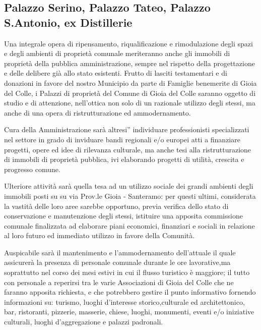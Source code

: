 \documentclass[a4paper,14pt,italian]{sphinxmanual}
\begin{document}
\subsection{Palazzo Serino, Palazzo Tateo, Palazzo S.Antonio, ex Distillerie}
\label{\detokenize{cultura:palazzo-serino-palazzo-tateo-palazzo-s-antonio-ex-distillerie}}

Una integrale opera di ripensamento, riqualificazione e rimodulazione degli spazi e degli ambienti di proprietà comunale meriteranno anche gli immobili di proprietà della pubblica amministrazione, sempre nel rispetto della progettazione e delle delibere già allo stato esistenti.
Frutto di lasciti testamentari e di donazioni in favore del nostro Municipio da parte di Famiglie benemerite di Gioia del Colle, i Palazzi di proprietà del Comune di Gioia del Colle saranno oggetto di studio e di attenzione, nell’ottica non solo di un razionale utilizzo degli stessi, ma anche di una opera di ristrutturazione ed ammodernamento.

Cura della Amministrazione sarà altresi” individuare professionisti specializzati nel settore in grado di inviduare bandi regionali e/o europei atti a finanziare progetti, opere ed idee di rilevanza culturale, ma anche tesi alla ristrutturazione di immobili di proprietà pubblica, ivi elaborando progetti di utilità, crescita e progresso comune.

Ulteriore attività sarà quella tesa ad un utilizzo sociale dei grandi ambienti degli immobili posti su  su via Prov.le Gioia - Santeramo: per questi ultimi, considerata la vastità delle loro aree sarebbe opportuno, previa verifica dello stato di conservazione e manutenzione degli stessi, istituire una apposita commissione comunale finalizzata ad elaborare piani economici, finanziari e sociali in relazione al loro futuro ed immediato utilizzo in favore della Comunità.

Auspicabile sarà il mantenimento e l’ammodernamento dell’attuale  il quale assicurerà la presenza di personale comunale durante le ore lavorative,ma soprattutto nel corso dei mesi estivi in cui il flusso turistico è maggiore; il tutto con personale a reperirsi tra le varie Associazioni di Gioia del Colle che ne faranno apposita richiesta, e che potrebbero gestire il punto informativo fornendo informazioni su: turismo, luoghi d’interesse storico,culturale ed architettonico, bar, ristoranti, pizzerie, masserie, chiese, luoghi, monumenti, eventi e/o iniziative culturali, luoghi d’aggregazione e palazzi padronali.
\end{document}
